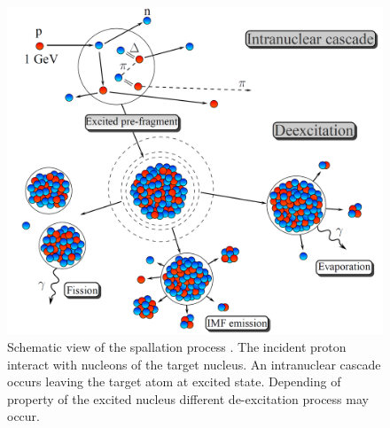\begin{figure}[!ht]
	\begin{center}
		\includegraphics[width=\textwidth]{01_Introduction/figures/fig000_spallation}
	\end{center}
	\caption[Schematic view of the spallation process.]{Schematic view of the spallation process \cite{gorbinet:tel-00660583}. The incident proton interact with nucleons of the target nucleus. An intranuclear cascade occurs leaving the target atom at excited state. Depending of property of the excited nucleus different de-excitation process may occur.}
	\label{chap1:fig:spallation}
\end{figure}
